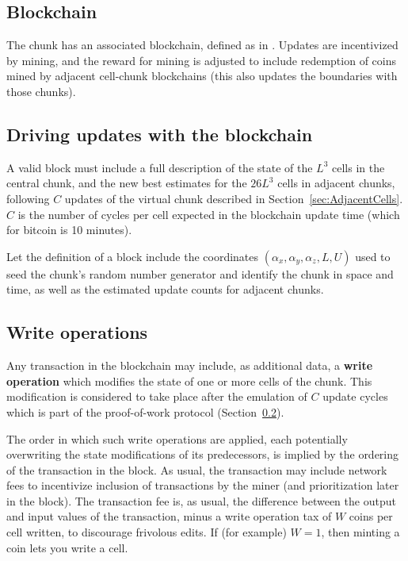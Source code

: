 \documentclass{article}
\begin{document}
\subsection{Blockchain}
\label{sec:Blockchain}

The chunk has an associated blockchain, defined as in \cite{Nakamoto2008}.
Updates are incentivized by mining,
and the reward for mining is adjusted to include redemption of coins mined by adjacent cell-chunk blockchains
(this also updates the boundaries with those chunks).

\subsection{Driving updates with the blockchain}
\label{sec:ProofOfWork}

A valid block must include a full description of the state of the $L^3$ cells in the central chunk,
and the new best estimates for the $26L^3$ cells in adjacent chunks,
following $C$ updates of the virtual chunk described in Section~\ref{sec:AdjacentCells}.
$C$ is the number of cycles per cell expected in the blockchain update time
(which for bitcoin is 10 minutes).

Let the definition of a block include the coordinates $(\alpha_x,\alpha_y,\alpha_z,L,U)$
used to seed the chunk's random number generator and identify the chunk in space and time,
as well as the estimated update counts for adjacent chunks.

\subsection{Write operations}

Any transaction in the blockchain may include, as additional data,
a {\bf write operation} which modifies the state of one or more cells of the chunk.
This modification is considered to take place after the emulation of $C$ update cycles
which is part of the proof-of-work protocol (Section~\ref{sec:ProofOfWork}).

The order in which such write operations are applied,
each potentially overwriting the state modifications of its predecessors,
is implied by the ordering of the transaction in the block.
As usual, the transaction may include network fees to incentivize inclusion of transactions
by the miner
(and prioritization later in the block).
The transaction fee is, as usual, the difference between the output and input values of the transaction,
minus a write operation tax of $W$ coins per cell written,
to discourage frivolous edits.
If (for example) $W=1$, then minting a coin lets you write a cell.
\end{document}
